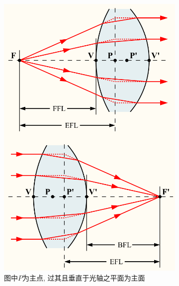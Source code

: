 \documentclass{ctexart}
\begin{document}
\begin{figure}[htbp]
    \centering
    \begin{subfigure}{.4\textwidth}
        \centering
        \includegraphics[width=\linewidth]{src/CardinalPoints.png}
        \caption{图中$P$为主点, 过其且垂直于光轴之平面为主面}
        \label{fig:主点示意图}
    \end{subfigure}
    \begin{subfigure}{.4\textwidth}

\end{subfigure}
\end{figure}
\end{document}
